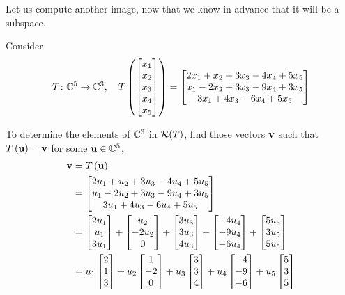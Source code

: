 \documentclass{ximera}
\begin{document}
Let us compute another image, now that we know in advance that it will be a subspace.



\begin{example}
Consider
\[
T\colon \mathbb{C}^{5}\rightarrow\mathbb{C}^{3},\quad
T\left(\begin{bmatrix}x_1\\x_2\\x_3\\x_4\\x_5\end{bmatrix}\right)=
\begin{bmatrix}2 x_1 + x_2 + 3 x_3 - 4 x_4 + 5 x_5\\
x_1 - 2 x_2 + 3 x_3 - 9 x_4 + 3 x_5\\
3 x_1 + 4 x_3 - 6 x_4 + 5 x_5\end{bmatrix}
\]

To determine the elements of $\mathbb{C}^{3}$ in $\mathcal{R}\!\left(T\right)$, find those vectors $\mathbf{v}$ such that $T\left(\mathbf{u}\right)=\mathbf{v}$ for some $\mathbf{u}\in\mathbb{C}^{5}$,
\begin{align*}
\mathbf{v}&=T\left(\mathbf{u}\right)\\
&=
\begin{bmatrix}
2 u_1 + u_2 + 3 u_3 - 4 u_4 + 5 u_5\\
u_1 - 2 u_2 + 3 u_3 - 9 u_4 + 3 u_5\\
3 u_1 + 4 u_3 - 6 u_4 + 5 u_5\end{bmatrix}\\
&=
\begin{bmatrix}2u_1\\u_1\\3u_1\end{bmatrix}+
\begin{bmatrix}u_2\\-2u_2\\0\end{bmatrix}+
\begin{bmatrix}3u_3\\3u_3\\4u_3\end{bmatrix}+
\begin{bmatrix}-4u_4\\-9u_4\\-6u_4\end{bmatrix}+
\begin{bmatrix}5u_5\\3u_5\\5u_5\end{bmatrix}\\
&=
u_1\begin{bmatrix}2\\1\\3\end{bmatrix}+
u_2\begin{bmatrix}1\\-2\\0\end{bmatrix}+
u_3\begin{bmatrix}3\\3\\4\end{bmatrix}+
u_4\begin{bmatrix}-4\\-9\\-6\end{bmatrix}+
u_5\begin{bmatrix}5\\3\\5\end{bmatrix}\\
\end{align*}





\end{example}
\end{document}
